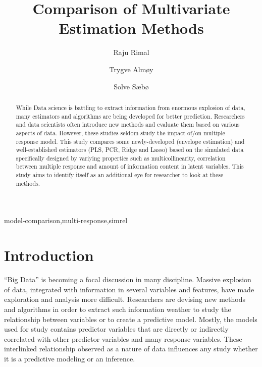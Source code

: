 \documentclass[12pt,3p,authoryear]{elsarticle}
\begin{document}
\begin{frontmatter}

  \title{Comparison of Multivariate Estimation Methods}
  
    \author[KBM]{Raju Rimal}
    \author[KBM]{Trygve Almøy}
  
    \author[NMBU]{Solve Sæbø}
  
      \address[KBM]{Faculty of Chemistry and Bioinformatics, Norwegian University of Life
Sciences, Ås, Norway}
    \address[NMBU]{Prorector, Norwegian University of Life Sciences, Ås, Norway}
  
  \begin{abstract}
  While Data science is battling to extract information from enormous
  explosion of data, many estimators and algorithms are being developed
  for better prediction. Researchers and data scientists often introduce
  new methods and evaluate them based on various aspects of data. However,
  these studies seldom study the impact of/on multiple response model.
  This study compares some newly-developed (envelope estimation) and
  well-established estimators (PLS, PCR, Ridge and Lasso) based on the
  simulated data specifically designed by variying properties such as
  multicollinearity, correlation between multiple response and amount of
  information content in latent variables. This study aims to identify
  itself as an additional eye for researcher to look at these methods.
  \end{abstract}
   \begin{keyword} model-comparison,multi-response,simrel\end{keyword}

\end{frontmatter}

\section{Introduction}\label{introduction}

``Big Data'' is becoming a focal discussion in many discipline. Massive
explosion of data, integrated with information in several variables and
features, have made exploration and analysis more difficult. Researchers
are devising new methods and algorithms in order to extract such
information weather to study the relationship between variables or to
create a predictive model. Mostly, the models used for study contains
predictor variables that are directly or indirectly correlated with
other predictor variables and many response variables. These interlinked
relationship observed as a nature of data influences any study whether
it is a predictive modeling or an inference.
\end{document}
